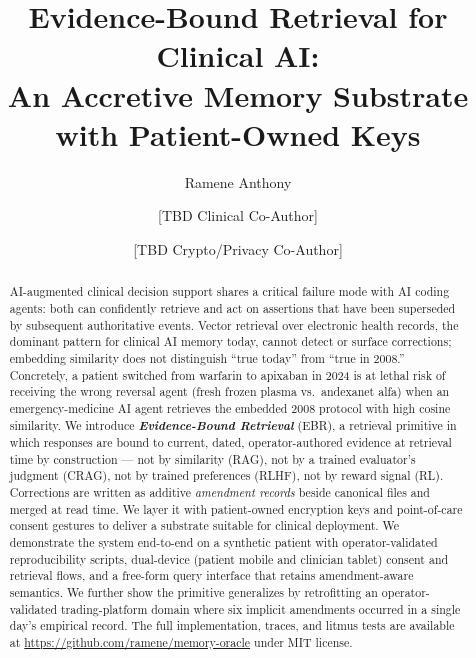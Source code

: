 \documentclass[runningheads]{llncs}
\title{Evidence-Bound Retrieval for Clinical AI:\\
       An Accretive Memory Substrate\\
       with Patient-Owned Keys}
\author{Ramene Anthony\inst{1}\orcidID{0000-0000-0000-0000}
        \and [TBD Clinical Co-Author]\inst{2}
        \and [TBD Crypto/Privacy Co-Author]\inst{3}}
\institute{
  Independent Researcher \\
  \url{https://github.com/ramene/memory-oracle}
  \and Department of TBD, TBD University, Country
  \and Department of TBD, TBD University, Country
}
\begin{document}
\maketitle

\begin{abstract}
AI-augmented clinical decision support shares a critical failure mode with AI
coding agents: both can confidently retrieve and act on assertions that have
been superseded by subsequent authoritative events. Vector retrieval over
electronic health records, the dominant pattern for clinical AI memory today,
cannot detect or surface corrections; embedding similarity does not distinguish
``true today'' from ``true in 2008.'' Concretely, a patient switched from
warfarin to apixaban in 2024 is at lethal risk of receiving the wrong reversal
agent (fresh frozen plasma vs.\ andexanet alfa) when an emergency-medicine AI
agent retrieves the embedded 2008 protocol with high cosine similarity. We
introduce \textbf{\emph{Evidence-Bound Retrieval}} (EBR), a retrieval primitive
in which responses are bound to current, dated, operator-authored evidence at
retrieval time by construction --- not by similarity (RAG), not by a trained
evaluator's judgment (CRAG), not by trained preferences (RLHF), not by reward
signal (RL). Corrections are written as additive \emph{amendment records}
beside canonical files and merged at read time. We layer it with patient-owned
encryption keys and
point-of-care consent gestures to deliver a substrate suitable for clinical
deployment. We demonstrate the system end-to-end on a synthetic patient with
operator-validated reproducibility scripts, dual-device (patient mobile and
clinician tablet) consent and retrieval flows, and a free-form query interface
that retains amendment-aware semantics. We further show the primitive
generalizes by retrofitting an operator-validated trading-platform domain
where six implicit amendments occurred in a single day's empirical record.
The full implementation, traces, and litmus tests are available at
\url{https://github.com/ramene/memory-oracle} under MIT license.

\end{abstract}

\end{document}

